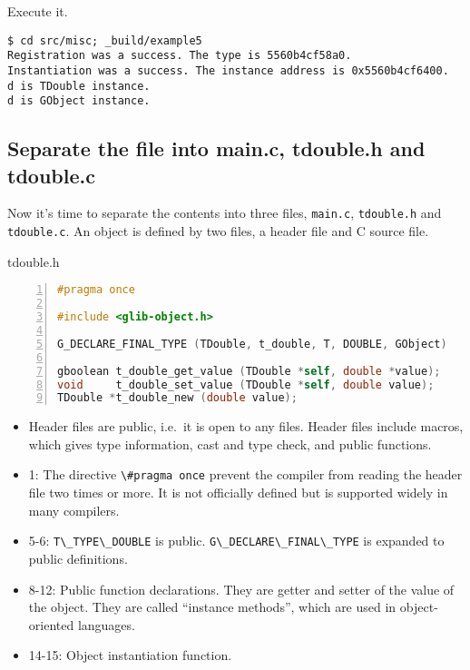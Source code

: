 Execute it.

\begin{lstlisting}
$ cd src/misc; _build/example5
Registration was a success. The type is 5560b4cf58a0.
Instantiation was a success. The instance address is 0x5560b4cf6400.
d is TDouble instance.
d is GObject instance.
\end{lstlisting}

\subsection{Separate the file into main.c, tdouble.h and
tdouble.c}\label{separate-the-file-into-main.c-tdouble.h-and-tdouble.c}

Now it's time to separate the contents into three files,
\passthrough{\lstinline!main.c!}, \passthrough{\lstinline!tdouble.h!}
and \passthrough{\lstinline!tdouble.c!}. An object is defined by two
files, a header file and C source file.

tdouble.h

\begin{lstlisting}[language=C, numbers=left]
#pragma once

#include <glib-object.h>

G_DECLARE_FINAL_TYPE (TDouble, t_double, T, DOUBLE, GObject)

gboolean t_double_get_value (TDouble *self, double *value);
void     t_double_set_value (TDouble *self, double value);
TDouble *t_double_new (double value);
\end{lstlisting}

\begin{itemize}
\tightlist
\item
  Header files are public, i.e.~it is open to any files. Header files
  include macros, which gives type information, cast and type check, and
  public functions.
\item
  1: The directive \passthrough{\lstinline!\#pragma once!} prevent the
  compiler from reading the header file two times or more. It is not
  officially defined but is supported widely in many compilers.
\item
  5-6: \passthrough{\lstinline!T\_TYPE\_DOUBLE!} is public.
  \passthrough{\lstinline!G\_DECLARE\_FINAL\_TYPE!} is expanded to
  public definitions.
\item
  8-12: Public function declarations. They are getter and setter of the
  value of the object. They are called ``instance methods'', which are
  used in object-oriented languages.
\item
  14-15: Object instantiation function.
\end{itemize}

